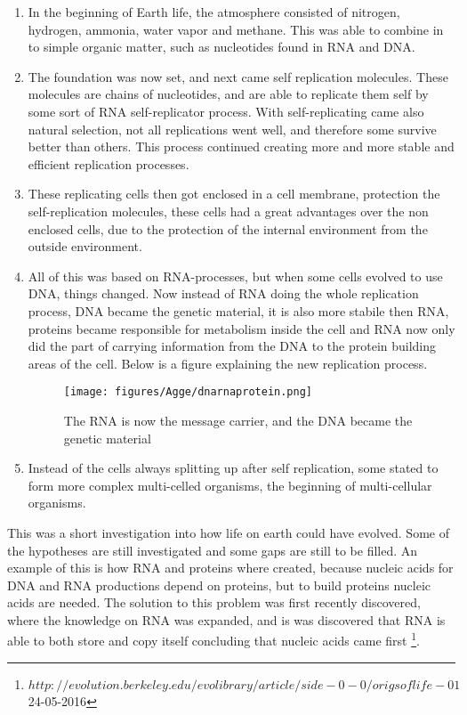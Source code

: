 \begin{enumerate}
  \item In the beginning of Earth life, the atmosphere consisted of nitrogen, hydrogen, ammonia, water vapor and methane. This was able to combine in to simple organic matter, such as nucleotides found in RNA and DNA.
  
  \item The foundation was now set, and next came self replication molecules. These molecules are chains of nucleotides, and are able to replicate them self by some sort of RNA self-replicator process. With self-replicating came also natural selection, not all replications went well, and therefore some survive better than others. This process continued creating more and more stable and efficient replication processes.
  
  \item These replicating cells then got enclosed in a cell membrane, protection the self-replication molecules, these cells had a great advantages over the non enclosed cells, due to the protection of the internal environment from the outside environment.
  
  \item All of this was based on RNA-processes, but when some cells evolved to use DNA, things changed. Now instead of RNA doing the whole replication process, DNA became the genetic material, it is also more stabile then RNA, proteins became responsible for metabolism inside the cell and RNA now only did the part of carrying information from the DNA to the protein building areas of the cell. Below is a figure explaining the new replication process.

\begin{figure}[H]
\caption{The RNA is now the message carrier, and the DNA became the genetic material}
\centering
\texttt{[image: figures/Agge/dnarnaprotein.png]} 
\end{figure}
  
  \item Instead of the cells always splitting up after self replication, some stated to form more complex multi-celled organisms, the beginning of multi-cellular organisms.
\end{enumerate} \par

This was a short investigation into how life on earth could have evolved. Some of the hypotheses are still investigated and some gaps are still to be filled. An example of this is how RNA and proteins where created, because nucleic acids for DNA and RNA productions depend on proteins, but to build proteins nucleic acids are needed. The solution to this problem was first recently discovered, where the knowledge on RNA was expanded, and is was discovered that RNA is able to both store and copy itself concluding that nucleic acids came first \footnote{$http://evolution.berkeley.edu/evolibrary/article/side-0-0/origsoflife-01$24-05-2016}. \par

